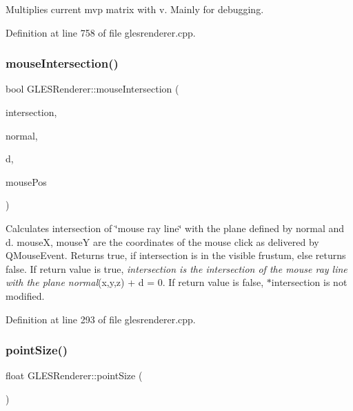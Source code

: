 Multiplies current mvp matrix with v. Mainly for debugging. 

Definition at line 758 of file glesrenderer.\+cpp.

\mbox{\label{class_g_l_e_s_renderer_a2c8f6b6ff0df6acafc6cbd7a82678a17}} 
\subsubsection{\texorpdfstring{mouseIntersection()}{mouseIntersection()}}
{\footnotesize\ttfamily bool G\+L\+E\+S\+Renderer\+::mouse\+Intersection (\begin{DoxyParamCaption}\item[{Q\+Vector3D $\ast$}]{intersection,  }\item[{Q\+Vector3D}]{normal,  }\item[{float}]{d,  }\item[{const Q\+Point \&}]{mouse\+Pos }\end{DoxyParamCaption})}

Calculates intersection of \char`\"{}mouse ray line\char`\"{} with the plane defined by normal and d. mouseX, mouseY are the coordinates of the mouse click as delivered by Q\+Mouse\+Event. Returns true, if intersection is in the visible frustum, else returns false. If return value is true, {\itshape intersection is the intersection of the mouse ray line with the plane normal}(x,y,z) + d = 0. If return value is false, $\ast$intersection is not modified. 

Definition at line 293 of file glesrenderer.\+cpp.

\mbox{\label{class_g_l_e_s_renderer_a2ba82f565d0a34259614448407cdad11}} 
\subsubsection{\texorpdfstring{pointSize()}{pointSize()}}
{\footnotesize\ttfamily float G\+L\+E\+S\+Renderer\+::point\+Size (\begin{DoxyParamCaption}{ }\end{DoxyParamCaption})\hspace{0.3cm}{\ttfamily [inline]}}


